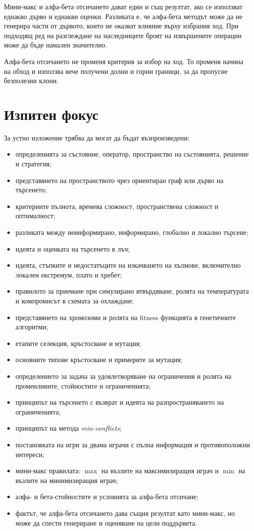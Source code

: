 Мини-макс и алфа-бета отсичането дават един и същ резултат, ако се използват еднакво дърво и еднакви оценки. Разликата е, че алфа-бета методът може да не генерира части от дървото, които не оказват влияние върху избрания ход. При подходящ ред на разглеждане на наследниците броят на извършените операции може да бъде намален значително.

\begin{remark}
Алфа-бета отсичането не променя критерия за избор на ход. То променя начина на обход и използва вече получени долни и горни граници, за да пропусне безполезни клони.
\end{remark}

\section{Изпитен фокус}\label{s:25.2}

За устно изложение трябва да могат да бъдат възпроизведени:

\begin{itemize}
\item определенията за състояние, оператор, пространство на състоянията, решение и стратегия;
\item представянето на пространството чрез ориентиран граф или дърво на търсенето;
\item критериите пълнота, времева сложност, пространствена сложност и оптималност;
\item разликата между неинформирано, информирано, глобално и локално търсене;
\item идеята и оценката на търсенето в лъч;
\item идеята, стъпките и недостатъците на изкачването на хълмове, включително локален екстремум, плато и хребет;
\item правилото за приемане при симулирано втвърдяване, ролята на температурата и компромисът в схемата за охлаждане;
\item представянето на хромозоми и ролята на fitness функцията в генетичните алгоритми;
\item етапите селекция, кръстосване и мутация;
\item основните типове кръстосване и примерите за мутация;
\item определението за задача за удовлетворяване на ограничения и ролята на променливите, стойностите и ограниченията;
\item принципът на търсенето с възврат и идеята на разпространяването на ограниченията;
\item принципът на метода \emph{min-conflicts};
\item постановката на игри за двама играчи с пълна информация и противоположни интереси;
\item мини-макс правилата: $\max$ на възлите на максимизиращия играч и $\min$ на възлите на минимизиращия играч;
\item алфа- и бета-стойностите и условията за алфа-бета отсичане;
\item фактът, че алфа-бета отсичането дава същия резултат като мини-макс, но може да спести генериране и оценяване на цели поддървета.
\end{itemize}

